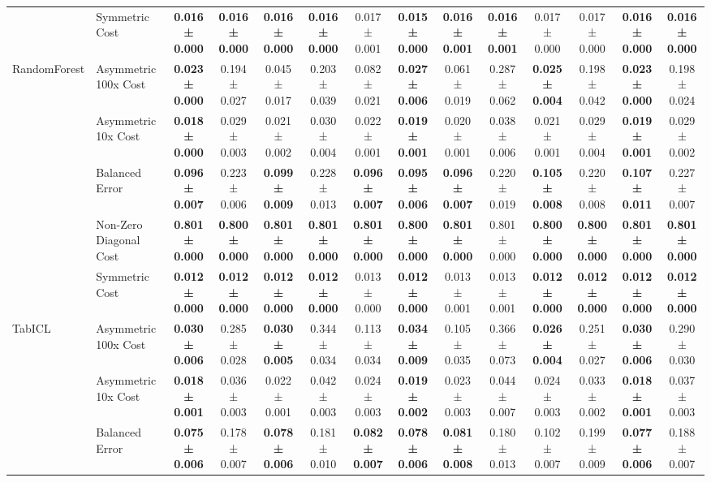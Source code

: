 \begin{table}[H]
{\begin{tabular}{llcccccccccccc}
 & Symmetric Cost & \textbf{0.016 ± 0.000} & \textbf{0.016 ± 0.000} & \textbf{0.016 ± 0.000} & \textbf{0.016 ± 0.000} & 0.017 ± 0.001 & \textbf{0.015 ± 0.000} & \textbf{0.016 ± 0.001} & \textbf{0.016 ± 0.001} & 0.017 ± 0.000 & 0.017 ± 0.000 & \textbf{0.016 ± 0.000} & \textbf{0.016 ± 0.000} \\
\cline{1-14}
\multirow[t]{5}{*}{RandomForest} & Asymmetric 100x Cost & \textbf{0.023 ± 0.000} & 0.194 ± 0.027 & 0.045 ± 0.017 & 0.203 ± 0.039 & 0.082 ± 0.021 & \textbf{0.027 ± 0.006} & 0.061 ± 0.019 & 0.287 ± 0.062 & \textbf{0.025 ± 0.004} & 0.198 ± 0.042 & \textbf{0.023 ± 0.000} & 0.198 ± 0.024 \\
 & Asymmetric 10x Cost & \textbf{0.018 ± 0.000} & 0.029 ± 0.003 & 0.021 ± 0.002 & 0.030 ± 0.004 & 0.022 ± 0.001 & \textbf{0.019 ± 0.001} & 0.020 ± 0.001 & 0.038 ± 0.006 & 0.021 ± 0.001 & 0.029 ± 0.004 & \textbf{0.019 ± 0.001} & 0.029 ± 0.002 \\
 & Balanced Error & \textbf{0.096 ± 0.007} & 0.223 ± 0.006 & \textbf{0.099 ± 0.009} & 0.228 ± 0.013 & \textbf{0.096 ± 0.007} & \textbf{0.095 ± 0.006} & \textbf{0.096 ± 0.007} & 0.220 ± 0.019 & \textbf{0.105 ± 0.008} & 0.220 ± 0.008 & \textbf{0.107 ± 0.011} & 0.227 ± 0.007 \\
 & Non-Zero Diagonal Cost & \textbf{0.801 ± 0.000} & \textbf{0.800 ± 0.000} & \textbf{0.801 ± 0.000} & \textbf{0.801 ± 0.000} & \textbf{0.801 ± 0.000} & \textbf{0.800 ± 0.000} & \textbf{0.801 ± 0.000} & 0.801 ± 0.000 & \textbf{0.800 ± 0.000} & \textbf{0.800 ± 0.000} & \textbf{0.801 ± 0.000} & \textbf{0.801 ± 0.000} \\
 & Symmetric Cost & \textbf{0.012 ± 0.000} & \textbf{0.012 ± 0.000} & \textbf{0.012 ± 0.000} & \textbf{0.012 ± 0.000} & 0.013 ± 0.000 & \textbf{0.012 ± 0.000} & 0.013 ± 0.001 & 0.013 ± 0.001 & \textbf{0.012 ± 0.000} & \textbf{0.012 ± 0.000} & \textbf{0.012 ± 0.000} & \textbf{0.012 ± 0.000} \\
\cline{1-14}
\multirow[t]{5}{*}{TabICL} & Asymmetric 100x Cost & \textbf{0.030 ± 0.006} & 0.285 ± 0.028 & \textbf{0.030 ± 0.005} & 0.344 ± 0.034 & 0.113 ± 0.034 & \textbf{0.034 ± 0.009} & 0.105 ± 0.035 & 0.366 ± 0.073 & \textbf{0.026 ± 0.004} & 0.251 ± 0.027 & \textbf{0.030 ± 0.006} & 0.290 ± 0.030 \\
 & Asymmetric 10x Cost & \textbf{0.018 ± 0.001} & 0.036 ± 0.003 & 0.022 ± 0.001 & 0.042 ± 0.003 & 0.024 ± 0.003 & \textbf{0.019 ± 0.002} & 0.023 ± 0.003 & 0.044 ± 0.007 & 0.024 ± 0.003 & 0.033 ± 0.002 & \textbf{0.018 ± 0.001} & 0.037 ± 0.003 \\
 & Balanced Error & \textbf{0.075 ± 0.006} & 0.178 ± 0.007 & \textbf{0.078 ± 0.006} & 0.181 ± 0.010 & \textbf{0.082 ± 0.007} & \textbf{0.078 ± 0.006} & \textbf{0.081 ± 0.008} & 0.180 ± 0.013 & 0.102 ± 0.007 & 0.199 ± 0.009 & \textbf{0.077 ± 0.006} & 0.188 ± 0.007 \\

\end{tabular}}
\end{table}
